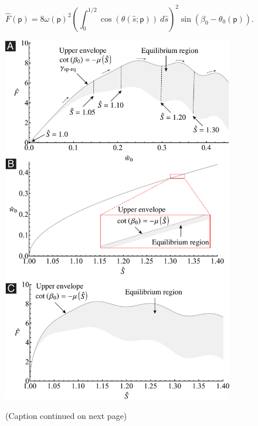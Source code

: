 \documentclass[preprint,10pt,times]{elsarticle}
\numberwithin{equation}{section}
\newcommand{\pr}[1]{\left( #1 \right)}
\newcommand{\idp}{\mathsf{p}}
\begin{document}
\begin{equation}
\hat{F}\pr{\idp}=8\omega\pr{\idp}^{2}\left(\int_{0}^{1/2}\cos\pr{\theta\pr{\hat{s};\idp}}\ d\hat{s}\right)^{2}\sin\left(\beta_{0}-\theta_{0}\pr{\idp}\right).
\label{eq:FhatSol}
\end{equation}

\begin{figure}
\centering{}
\includegraphics[width=0.9\textwidth]{../Figures_Submit/EquilibriumRegion_V2.pdf}
\label{fig:EquilibriumRegions}
\caption{(Caption continued on next page)}
\end{figure}
\end{document}
